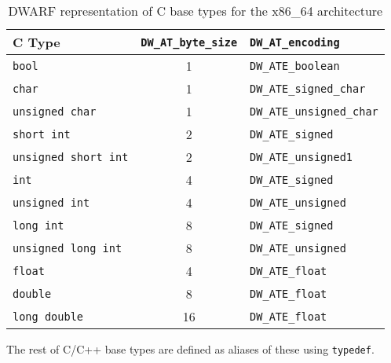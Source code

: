 \begin{table}[ht]
	\begin{center}
		\begin{tabular}{lcl}
			\toprule
			C Type & \verb|DW_AT_byte_size| & \verb|DW_AT_encoding| \\
			\midrule
			\texttt{bool}               & 1 & \verb|DW_ATE_boolean| \\
			\texttt{char}               & 1 & \verb|DW_ATE_signed_char| \\
			\texttt{unsigned char}      & 1 & \verb|DW_ATE_unsigned_char| \\
			\texttt{short int}          & 2 & \verb|DW_ATE_signed| \\
			\texttt{unsigned short int} & 2 & \verb|DW_ATE_unsigned1| \\
			\texttt{int}                & 4 & \verb|DW_ATE_signed| \\
			\texttt{unsigned int}       & 4 & \verb|DW_ATE_unsigned| \\
			\texttt{long int}           & 8 & \verb|DW_ATE_signed| \\
			\texttt{unsigned long int}  & 8 & \verb|DW_ATE_unsigned| \\
			\texttt{float}              & 4 & \verb|DW_ATE_float| \\
			\texttt{double}             & 8 & \verb|DW_ATE_float| \\
			\texttt{long double}        & 16& \verb|DW_ATE_float| \\
			\bottomrule
		\end{tabular}
	\end{center}
	\caption{DWARF representation of C base types for the x86\_64 architecture}
	\label{tab:dwarf-base-types-mapping}
\end{table}

The rest of C/C++ base types are defined as aliases of these
using \texttt{typedef}.



